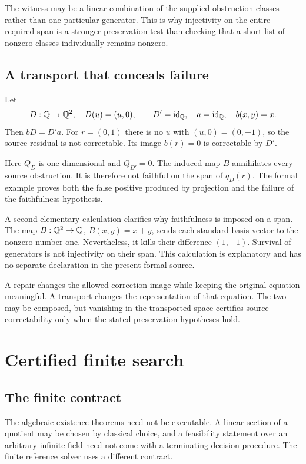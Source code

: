 The witness may be a linear combination of the supplied obstruction classes rather than one particular generator. This is why injectivity on the entire required span is a stronger preservation test than checking that a short list of nonzero classes individually remains nonzero.

\subsection{A transport that conceals failure}
\begin{CRexample}\label{CR:ex:loss}
Let
\[
D:\mathbb{Q}\to\mathbb{Q}^2,\quad D(u)=(u,0),\qquad
D'=\operatorname{id}_{\mathbb{Q}},\quad a=\operatorname{id}_{\mathbb{Q}},\quad b(x,y)=x.
\]
Then $bD=D'a$. For $r=(0,1)$ there is no $u$ with $(u,0)=(0,-1)$, so the source residual is not correctable. Its image $b(r)=0$ is correctable by $D'$.
\end{CRexample}

Here $Q_D$ is one dimensional and $Q_{D'}=0$. The induced map $B$ annihilates every source obstruction. It is therefore not faithful on the span of $q_D(r)$. The formal example proves both the false positive produced by projection and the failure of the faithfulness hypothesis.

A second elementary calculation clarifies why faithfulness is imposed on a span. The map $B:\mathbb{Q}^2\to\mathbb{Q}$, $B(x,y)=x+y$, sends each standard basis vector to the nonzero number one. Nevertheless, it kills their difference $(1,-1)$. Survival of generators is not injectivity on their span. This calculation is explanatory and has no separate declaration in the present formal source.

\begin{scopebox}[title=Transport is not repair]
A repair changes the allowed correction image while keeping the original equation meaningful. A transport changes the representation of that equation. The two may be composed, but vanishing in the transported space certifies source correctability only when the stated preservation hypotheses hold.
\end{scopebox}

\section{Certified finite search}\label{CR:cr-source-section-5}\label{CR:ch:search}
\subsection{The finite contract}
The algebraic existence theorems need not be executable. A linear section of a quotient may be chosen by classical choice, and a feasibility statement over an arbitrary infinite field need not come with a terminating decision procedure. The finite reference solver uses a different contract.

